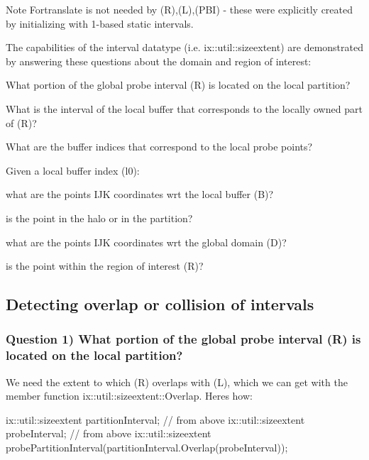 \begin{DoxyNote}{Note}
Fortranslate is not needed by (R),(L),(P\+BI) -\/ these were explicitly created by initializing with 1-\/based static intervals.
\end{DoxyNote}
The capabilities of the interval datatype (i.\+e. ix\+::util\+::sizeextent) are demonstrated by answering these questions about the domain and region of interest\+:


\begin{DoxyEnumerate}
\item What portion of the global probe interval (R) is located on the local partition?
\item What is the interval of the local buffer that corresponds to the locally owned part of (R)?
\item What are the buffer indices that correspond to the local probe points?
\item Given a local buffer index (l0)\+:
\begin{DoxyEnumerate}
\item what are the point\textquotesingle{}s I\+JK coordinates wrt the local buffer (B)?
\item is the point in the halo or in the partition?
\item what are the point\textquotesingle{}s I\+JK coordinates wrt the global domain (D)?
\item is the point within the region of interest (R)?
\end{DoxyEnumerate}
\end{DoxyEnumerate}\hypertarget{developer_reference_overlap}{}\subsection{Detecting overlap or collision of intervals}\label{developer_reference_overlap}
\subsubsection*{Question 1) What portion of the global probe interval (R) is located on the local partition?}

We need the extent to which (R) overlaps with (L), which we can get with the member function ix\+::util\+::sizeextent\+::\+Overlap. Here\textquotesingle{}s how\+:


\begin{DoxyCode}
ix::util::sizeextent partitionInterval; \textcolor{comment}{// from above}
ix::util::sizeextent probeInterval;     \textcolor{comment}{// from above }
ix::util::sizeextent probePartitionInterval(partitionInterval.Overlap(probeInterval)); 
\end{DoxyCode}


